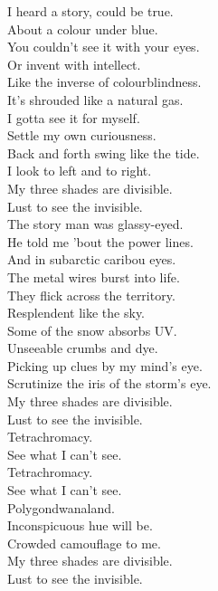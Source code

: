 

I heard a story, could be true. \\
About a colour under blue. \\
You couldn't see it with your eyes. \\
Or invent with intellect. \\

Like the inverse of colourblindness. \\
It's shrouded like a natural gas. \\
I gotta see it for myself. \\
Settle my own curiousness. \\

Back and forth swing like the tide. \\
I look to left and to right. \\
My three shades are divisible. \\
Lust to see the invisible. \\

The story man was glassy-eyed. \\
He told me 'bout the power lines. \\
And in subarctic caribou eyes. \\
The metal wires burst into life. \\

They flick across the territory. \\
Resplendent like the sky. \\
Some of the snow absorbs UV. \\
Unseeable crumbs and dye. \\

Picking up clues by my mind's eye. \\
Scrutinize the iris of the storm's eye. \\
My three shades are divisible. \\
Lust to see the invisible. \\

Tetrachromacy. \\
See what I can't see. \\
Tetrachromacy. \\
See what I can't see. \\

Polygondwanaland. \\

Inconspicuous hue will be. \\
Crowded camouflage to me. \\
My three shades are divisible. \\
Lust to see the invisible. \\

